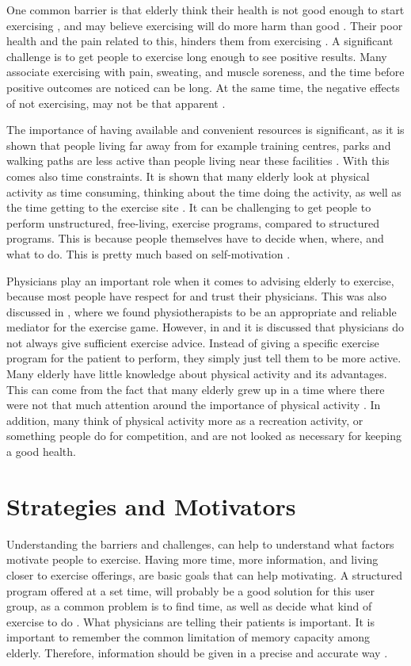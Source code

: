 One common barrier is that elderly think their health is not good enough to start exercising \cite{schutzer}, and may believe exercising will do more harm than good \cite{chao}. Their poor health and the pain related to this, hinders them from exercising \cite{schutzer}. A significant challenge is to get people to exercise long enough to see positive results. Many associate exercising with pain, sweating, and muscle soreness, and the time before positive outcomes are noticed can be long. At the same time, the negative effects of not exercising, may not be that apparent \cite{chao}. 

The importance of having available and convenient resources is significant, as it is shown that people living far away from for example training centres, parks and walking paths are less active than people living near these facilities \cite{schutzer}. With this comes also time constraints. It is shown that many elderly look at physical activity as time consuming, thinking about the time doing the activity, as well as the time getting to the exercise site \cite{schutzer} \cite{chao}. It can be challenging to get people to perform unstructured, free-living, exercise programs, compared to structured programs. This is because people themselves have to decide when, where, and what to do. This is pretty much based on self-motivation \cite{chao}.  

Physicians play an important role when it comes to advising elderly to exercise, because most people have respect for and trust their physicians. This was also discussed in \cite{project}, where we found physiotherapists to be an appropriate and reliable mediator for the exercise game. However, in \cite{schutzer} and \cite{chao} it is discussed that physicians do not always give sufficient exercise advice. Instead of giving a specific exercise program for the patient to perform, they simply just tell them to be more active. Many elderly have little knowledge about physical activity and its advantages. This can come from the fact that many elderly grew up in a time where there were not that much attention around the importance of physical activity \cite{schutzer}. In addition, many think of physical activity more as a recreation activity, or something people do for competition, and are not looked as necessary for keeping a good health.  

\section{Strategies and Motivators}
\label{sec:motivators}
Understanding the barriers and challenges, can help to understand what factors motivate people to exercise. Having more time, more information, and living closer to exercise offerings, are basic goals that can help motivating.  A structured program offered at a set time, will probably be a good solution for this user group, as a common problem is to find time, as well as decide what kind of exercise to do \cite{chao}. What physicians are telling their patients is important. It is important to remember the common limitation of memory capacity among elderly. Therefore, information should be given in a precise and accurate way \cite{chao}.  

